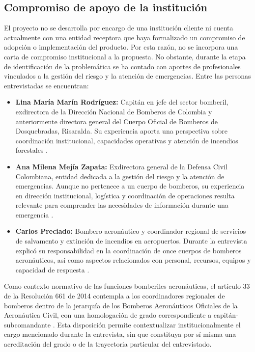 \subsection{Compromiso de apoyo de la institución}
\label{sec:apoyo}

El proyecto no se desarrolla por encargo de una institución cliente ni cuenta actualmente con una entidad receptora que haya formalizado un compromiso de adopción o implementación del producto. Por esta razón, no se incorpora una carta de compromiso institucional a la propuesta. No obstante, durante la etapa de identificación de la problemática se ha contado con aportes de profesionales vinculados a la gestión del riesgo y la atención de emergencias. Entre las personas entrevistadas se encuentran:

\begin{itemize}
    \item \textbf{Lina María Marín Rodríguez:} Capitán en jefe del sector bomberil, exdirectora de la Dirección Nacional de Bomberos de Colombia y anteriormente directora general del Cuerpo Oficial de Bomberos de Dosquebradas, Risaralda. Su experiencia aporta una perspectiva sobre coordinación institucional, capacidades operativas y atención de incendios forestales \cite{vfpLinaDosquebradas,vfpLinaDNBC2025,vfpLinaDNBC2026}.

    \item \textbf{Ana Milena Mejía Zapata:} Exdirectora general de la Defensa Civil Colombiana, entidad dedicada a la gestión del riesgo y la atención de emergencias. Aunque no pertenece a un cuerpo de bomberos, su experiencia en dirección institucional, logística y coordinación de operaciones resulta relevante para comprender las necesidades de información durante una emergencia \cite{vfpAnaDefensaCivil}.

    \item \textbf{Carlos Preciado:} Bombero aeronáutico y coordinador regional de servicios de salvamento y extinción de incendios en aeropuertos. Durante la entrevista explicó su responsabilidad en la coordinación de once cuerpos de bomberos aeronáuticos, así como aspectos relacionados con personal, recursos, equipos y capacidad de respuesta \cite{entrevistas2026}.
\end{itemize}

Como contexto normativo de las funciones bomberiles aeronáuticas, el artículo 33 de la Resolución 661 de 2014 contempla a los coordinadores regionales de bomberos dentro de la jerarquía de los Bomberos Aeronáuticos Oficiales de la Aeronáutica Civil, con una homologación de grado correspondiente a capitán-subcomandante \cite{vfpResolucion661SEI}. Esta disposición permite contextualizar institucionalmente el cargo mencionado durante la entrevista, sin que constituya por sí misma una acreditación del grado o de la trayectoria particular del entrevistado.

